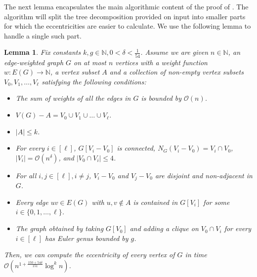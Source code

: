 \documentclass[11pt,a4paper]{article}
\newtheorem{lemma}{Lemma}[section]
\newcommand{\Oh}{\mathcal{O}}
\renewcommand{\leq}{\leqslant}
\renewcommand{\setminus}{-}
\begin{document}
The next lemma encapsulates the main algorithmic content of the proof of . The algorithm will split the tree decomposition provided on input into smaller parts for which the eccentricities are easier to calculate. We use the following lemma to handle a single such part.
\begin{lemma}\label{l:star}
Fix constants $k, g \in \mathbb{N}, 0 < \delta < \frac{1}{54}$. Assume we are given $n \in \mathbb{N}$, an edge-weighted graph $G$ on at most $n$ vertices with a weight function $w \colon E(G) \to \mathbb{N}$, a vertex subset $A$ and a collection of non-empty vertex subsets $V_0, V_1, \dots, V_\ell$ satisfying the following conditions:
\begin{itemize}[nosep]
	\item The sum of weights of all the edges in $G$ is bounded by $\Oh(n)$.
	\item $V(G) \setminus A = V_0 \cup V_1 \cup \dots \cup V_\ell$.
	\item $|A| \leq k$.
	\item For every $i \in [\ell]$, $G[V_i \setminus V_0]$ is connected, $N_G(V_i \setminus V_0) = V_i \cap V_0$, $|V_i| = \Oh(n^\delta)$, and $|V_0 \cap V_i| \leq 4$.
	\item For all $i, j \in [\ell], i \neq j$, $V_i \setminus V_0$ and $V_j \setminus V_0$ are disjoint and non-adjacent in $G$.
	\item Every edge $uv \in E(G)$ with $u, v \not\in A$ is contained in $G[V_i]$ for some $i\in \{0,1,\ldots,\ell\}$.
	\item The graph obtained by taking $G[V_0]$ and adding a clique on $V_0 \cap V_i$ for every $i \in [\ell]$ has Euler genus bounded by $g$.
\end{itemize}
Then, we can compute the eccentricity of every vertex of $G$ in time $\Oh \left( n^{1 + \frac{150 + 54 \delta}{151}} \log^k n \right)$.
\end{lemma}
\end{document}
